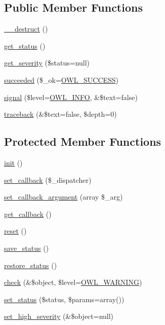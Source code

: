 \subsection*{Public Member Functions}
\begin{DoxyCompactItemize}
\item 
\hyperlink{class__OWL_a44fd2222476a3109286cc82d92b6bbcc}{\_\-\_\-destruct} ()
\item 
\hyperlink{class__OWL_a99ec771fa2c5c279f80152cc09e489a8}{get\_\-status} ()
\item 
\hyperlink{class__OWL_adf9509ef96858be7bdd9414c5ef129aa}{get\_\-severity} (\$status=null)
\item 
\hyperlink{class__OWL_ae76c46aff1ad253106332670fc59c777}{succeeded} (\$\_\-ok=\hyperlink{owl_8severitycodes_8php_a96223f06ba27bf5cbefa6e9d702897c2}{OWL\_\-SUCCESS})
\item 
\hyperlink{class__OWL_a51ba4a16409acf2a2f61f286939091a5}{signal} (\$level=\hyperlink{owl_8severitycodes_8php_a139328861128689f2f4def6a399d9057}{OWL\_\-INFO}, \&\$text=false)
\item 
\hyperlink{class__OWL_aa29547995d6741b7d2b90c1d4ea99a13}{traceback} (\&\$text=false, \$depth=0)
\end{DoxyCompactItemize}
\subsection*{Protected Member Functions}
\begin{DoxyCompactItemize}
\item 
\hyperlink{class__OWL_ae0ef3ded56e8a6b34b6461e5a721cd3e}{init} ()
\item 
\hyperlink{class__OWL_a28d9025eaf37b49d63cb334ed28c33f0}{set\_\-callback} (\$\_\-dispatcher)
\item 
\hyperlink{class__OWL_a1e26611ce858b237f5a98a91ea3c3a1b}{set\_\-callback\_\-argument} (array \$\_\-arg)
\item 
\hyperlink{class__OWL_abded13b1c97ea6e0cfe3c68cb6bcf7a5}{get\_\-callback} ()
\item 
\hyperlink{class__OWL_a2f2a042bcf31965194c03033df0edc9b}{reset} ()
\item 
\hyperlink{class__OWL_a9e49b9c76fbc021b244c6915ea536d71}{save\_\-status} ()
\item 
\hyperlink{class__OWL_a465eeaf40edd9f9c848841700c32ce55}{restore\_\-status} ()
\item 
\hyperlink{class__OWL_ae2e3c56e5f3c4ce4156c6b1bb1c50f63}{check} (\&\$object, \$level=\hyperlink{owl_8severitycodes_8php_ace886152e2e86cd2e91cb833fd495adb}{OWL\_\-WARNING})
\item 
\hyperlink{class__OWL_aea912d0ede9b3c2a69b79072d94d4787}{set\_\-status} (\$status, \$params=array())
\item 
\hyperlink{class__OWL_a576829692a3b66e3d518853bf43abae3}{set\_\-high\_\-severity} (\&\$object=null)
\end{DoxyCompactItemize}
